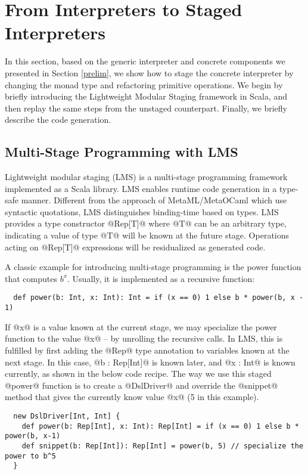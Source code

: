 \section{From Interpreters to Staged Interpreters} \label{stagedinterp}

In this section, based on the generic interpreter and concrete components we
presented in Section \ref{prelim}, we show how to stage the concrete
interpreter by changing the monad type and refactoring primitive
operations. We begin by briefly introducing the Lightweight Modular Staging
framework in Scala, and then replay the same steps from the unstaged
counterpart. Finally, we briefly describe the code generation.

\subsection{Multi-Stage Programming with LMS}

Lightweight modular staging (LMS) \cite{DBLP:conf/gpce/RompfO10} is a
multi-stage programming framework implemented as a Scala library. LMS enables
runtime code generation in a type-safe manner. Different from the approach of
MetaML/MetaOCaml \cite{DBLP:conf/flops/Kiselyov14, DBLP:conf/gpce/CalcagnoTHL03} which
use syntactic quotations, LMS distinguishes binding-time based on types. 
LMS provides a type constructor @Rep[T]@ where @T@ can be
an arbitrary type, indicating a value of type @T@ will be known at the future stage.
Operations acting on @Rep[T]@ expressions will be residualized as generated
code.

A classic example for introducing multi-stage programming is the power function
that computes $b^x$. Usually, it is implemented as a recursive function:
\begin{lstlisting}
  def power(b: Int, x: Int): Int = if (x == 0) 1 else b * power(b, x - 1)
\end{lstlisting}

If @x@ is a value known at the current stage, we may specialize the power function to
the value @x@ -- by unrolling the recursive calls. In LMS, this is fulfilled by
first adding the @Rep@ type annotation to variables known at the next stage. In this case,
@b : Rep[Int]@ is known later, and @x : Int@ is known currently, as shown in the
below code recipe.
The way we use this staged @power@ function is to create a @DslDriver@ and override the
@snippet@ method that gives the currently know value @x@ (5 in this example).
\begin{lstlisting}
  new DslDriver[Int, Int] {
    def power(b: Rep[Int], x: Int): Rep[Int] = if (x == 0) 1 else b * power(b, x-1)
    def snippet(b: Rep[Int]): Rep[Int] = power(b, 5) // specialize the power to b^5
  }
\end{lstlisting}

